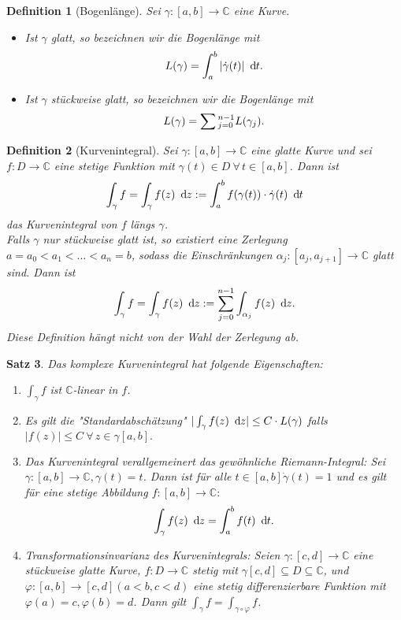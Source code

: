 \documentclass[a4paper,12pt]{article}
\theoremstyle{newthm}
\newtheorem{thm}{Satz}[subsection]
\theoremstyle{newdef}
\newtheorem{defn}[thm]{Definition}
\theoremstyle{newrem}
\newcommand{\C}{\mathbb{C}}
\renewcommand{\d}{\ \operatorname{d}\hspace{-2px}}
\begin{document}
		\begin{defn}[Bogenlänge]
			Sei $ \gamma: [a,b] \to \C $ eine Kurve.
			\begin{itemize}
				\item Ist $\gamma$ glatt, so bezeichnen wir die Bogenlänge mit 
				$$ L(\gamma) = \int_{a}^{b} |\dot{\gamma}(t)| \d t. $$
				\item Ist $\gamma$ stückweise glatt, so bezeichnen wir die Bogenlänge mit 
				$$ L(\gamma) = \sum\\
				_{j=0}^{n-1} L(\gamma_j). $$
			\end{itemize}
		\end{defn}
		
		\begin{defn}[Kurvenintegral]
			Sei $ \gamma: [a,b] \to \C $ eine glatte Kurve und sei $ f: D \to \C $ eine stetige Funktion mit $ \gamma(t) \in D \ \forall\, t \in [a,b] $. Dann ist 
			\[ \int_\gamma f = \int_\gamma f(z) \d z := \int_{a}^{b} f(\gamma(t)) \cdot \dot{\gamma}(t) \d t \]	
			das \emph{Kurvenintegral} von $f$ längs $\gamma$.\\
			Falls $\gamma$ nur stückweise glatt ist, so existiert eine Zerlegung $ a=a_0 < a_1 < \dots < a_n=b $, sodass die Einschränkungen $ \alpha_j : [a_j,a_{j+1}] \to \C $ glatt sind. Dann ist 
			\[ \int_\gamma f = \int_\gamma f(z) \d z := \sum_{j=0}^{n-1} \int_{\alpha_j} f(z) \d z. \]
			Diese Definition hängt nicht von der Wahl der Zerlegung ab.
		\end{defn}
		
		\begin{thm}
			Das komplexe Kurvenintegral hat folgende Eigenschaften:
			\begin{enumerate}
				\item $ \int_\gamma f $ ist $\C$-linear in $f$.
				\item Es gilt die "Standardabschätzung" $ |\int_\gamma f(z) \d z| \leq C \cdot L(\gamma) $ falls $ |f(z)| \leq C \ \forall\, z \in \gamma[a,b]. $
				\item Das Kurvenintegral verallgemeinert das gewöhnliche Riemann-Integral: Sei $ \gamma: [a,b] \to \C, \gamma(t) = t $. Dann ist für alle $ t \in [a,b] \dot{\gamma}(t) = 1 $ und es gilt für eine stetige Abbildung $ f: [a,b] \to \C:$
				$$ \int_\gamma f(z) \d z = \int_{a}^b f(t) \d t. $$
				\item Transformationsinvarianz des Kurvenintegrals: Seien $ \gamma: [c,d] \to \C $ eine stückweise glatte Kurve, $ f: D \to \C $ stetig mit $ \gamma[c,d] \subseteq D \subseteq \C $, und $ \varphi: [a,b] \to [c,d] (a<b,c<d) $ eine stetig differenzierbare Funktion mit $ \varphi(a) = c, \varphi(b) = d $. Dann gilt $ \int_\gamma f = \int_{\gamma \circ \varphi} f $.
			\end{enumerate}
		\end{thm}
		
\end{document}
